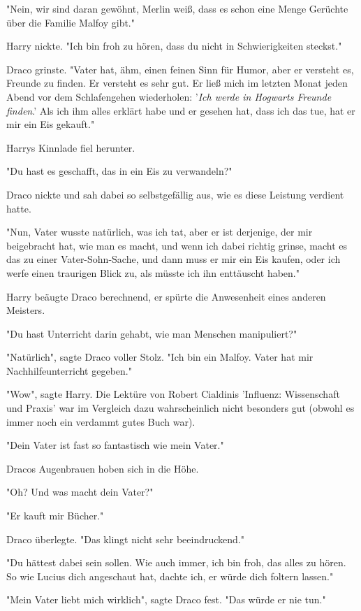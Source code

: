 {"Nein, wir sind daran gewöhnt, Merlin weiß, dass es schon eine Menge Gerüchte über die Familie Malfoy gibt."

Harry nickte. "Ich bin froh zu hören, dass du nicht in Schwierigkeiten steckst."

Draco grinste. "Vater hat, ähm, einen feinen Sinn für Humor, aber er versteht es, Freunde zu finden. Er versteht es sehr gut. Er ließ mich im letzten Monat jeden Abend vor dem Schlafengehen wiederholen: '\emph{Ich werde in Hogwarts Freunde finden}.' Als ich ihm alles erklärt habe und er gesehen hat, dass ich das tue, hat er mir ein Eis gekauft."

Harrys Kinnlade fiel herunter.

"Du hast es geschafft, das in ein Eis zu verwandeln?"

Draco nickte und sah dabei so selbstgefällig aus, wie es diese Leistung verdient hatte.

"Nun, Vater wusste natürlich, was ich tat, aber er ist derjenige, der mir beigebracht hat, wie man es macht, und wenn ich dabei richtig grinse, macht es das zu einer Vater-Sohn-Sache, und dann muss er mir ein Eis kaufen, oder ich werfe einen traurigen Blick zu, als müsste ich ihn enttäuscht haben."

Harry beäugte Draco berechnend, er spürte die Anwesenheit eines anderen Meisters.

"Du hast Unterricht darin gehabt, wie man Menschen manipuliert?"

"Natürlich", sagte Draco voller Stolz. "Ich bin ein Malfoy. Vater hat mir Nachhilfeunterricht gegeben."

"Wow", sagte Harry. Die Lektüre von Robert Cialdinis 'Influenz: Wissenschaft und Praxis' war im Vergleich dazu wahrscheinlich nicht besonders gut (obwohl es immer noch ein verdammt gutes Buch war).

"Dein Vater ist fast so fantastisch wie mein Vater."

Dracos Augenbrauen hoben sich in die Höhe.

"Oh? Und was macht dein Vater?"

"Er kauft mir Bücher."

Draco überlegte. "Das klingt nicht sehr beeindruckend."

"Du hättest dabei sein sollen. Wie auch immer, ich bin froh, das alles zu hören. So wie Lucius dich angeschaut hat, dachte ich, er würde dich foltern lassen."

"Mein Vater liebt mich wirklich", sagte Draco fest. "Das würde er nie tun."

}
